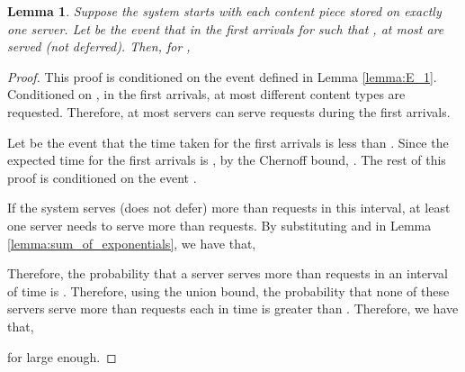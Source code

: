 \documentclass[10pt, conference, letterpaper]{IEEEtran}
\newtheorem{lemma}{Lemma}
\begin{document}
\begin{lemma}
	\label{lemma:E_2}
	Suppose the system starts with each content piece stored on exactly one server. Let  be the event that in the first  arrivals for  such that , at most  are served (not deferred). Then, for ,
	
\end{lemma}
\begin{proof}
	This proof is conditioned on the event  defined in Lemma \ref{lemma:E_1}. Conditioned on , in the first  arrivals, at most  different content types are requested. Therefore, at most  servers can serve requests during the first  arrivals.
	
	Let  be the event that the time taken for the first  arrivals is less than . Since the expected time for the first  arrivals is , by the Chernoff bound, . The rest of this proof is conditioned on the event .
	
	If the system serves (does not defer) more than  requests in this interval, at least one server needs to serve more than  requests. By substituting  and  in Lemma \ref{lemma:sum_of_exponentials}, we have that,
	
	Therefore, the probability that a server serves more than  requests in an interval of  time is . Therefore, using the union bound, the probability that none of these  servers serve more than  requests each in  time is greater than .
	Therefore, we have that,
	
	for  large enough.
\end{proof}
\end{document}
